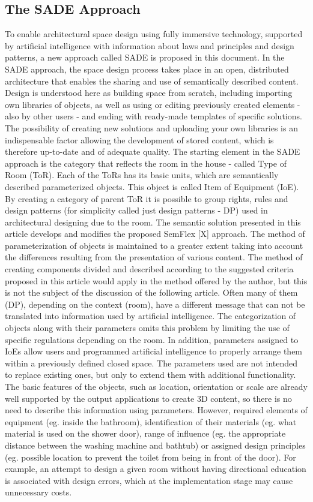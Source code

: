 \documentclass[runningheads]{llncs}
\begin{document}
\subsection{The SADE Approach}
To enable architectural space design using fully immersive technology, supported by artificial intelligence with information about laws and principles and design patterns, a new approach called SADE is proposed in this document.
In the SADE approach, the space design process takes place in an open, distributed architecture that enables the sharing and use of semantically described content. Design is understood here as building space from scratch, including importing own libraries of objects, as well as using or editing previously created elements - also by other users - and ending with ready-made templates of specific solutions. The possibility of creating new solutions and uploading your own libraries is an indispensable factor allowing the development of stored content, which is therefore up-to-date and of adequate quality.
The starting element in the SADE approach is the category that reflects the room in the house - called Type of Room (ToR). Each of the ToRs has its basic units, which are semantically described parameterized objects. This object is called Item of Equipment (IoE).
By creating a category of parent ToR it is possible to group rights, rules and design patterns (for simplicity called just design patterns - DP) used in architectural designing due to the room. The semantic solution presented in this article develops and modifies the proposed SemFlex [X] approach. The method of parameterization of objects is maintained to a greater extent taking into account the differences resulting from the presentation of various content. The method of creating components divided and described according to the suggested criteria proposed in this article would apply in the method offered by the author, but this is not the subject of the discussion of the following article. Often many of them (DP), depending on the context (room), have a different message that can not be translated into information used by artificial intelligence. The categorization of objects along with their parameters omits this problem by limiting the use of specific regulations depending on the room. In addition, parameters assigned to IoEs allow users and programmed artificial intelligence to properly arrange them within a previously defined closed space.
The parameters used are not intended to replace existing ones, but only to extend them with additional functionality. The basic features of the objects, such as location, orientation or scale are already well supported by the output applications to create 3D content, so there is no need to describe this information using parameters. However, required elements of equipment (eg. inside the bathroom), identification of their materials (eg. what material is used on the shower door), range of influence (eg. the appropriate distance between the washing machine and bathtub) or assigned design principles (eg. possible location to prevent the toilet from being in front of the door). For example, an attempt to design a given room without having directional education is associated with design errors, which at the implementation stage may cause unnecessary costs. 
\end{document}
